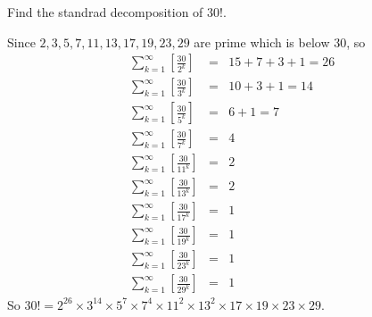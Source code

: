 \documentclass{ctexart}
\begin{document}
\begin{problem}\label{pro:p16.1}
  Find the standrad decomposition of \(30!\).
\end{problem}
\begin{solution}
  Since \(2,3,5,7,11,13,17,19,23,29\) are prime which is below \(30\), so
  \begin{equation}
    \begin{aligned}
      \sum_{k=1}^{\infty}[\frac{30}{2^k}]  & = & 15 + 7 + 3 + 1 =  26  \\
      \sum_{k=1}^{\infty}[\frac{30}{3^k}]  & = & 10 + 3 + 1      =  14 \\
      \sum_{k=1}^{\infty}[\frac{30}{5^k}]  & = & 6 + 1           =  7  \\
      \sum_{k=1}^{\infty}[\frac{30}{7^k}]  & = & 4                     \\
      \sum_{k=1}^{\infty}[\frac{30}{11^k}] & = & 2                     \\
      \sum_{k=1}^{\infty}[\frac{30}{13^k}] & = & 2                     \\
      \sum_{k=1}^{\infty}[\frac{30}{17^k}] & = & 1                     \\
      \sum_{k=1}^{\infty}[\frac{30}{19^k}] & = & 1                     \\
      \sum_{k=1}^{\infty}[\frac{30}{23^k}] & = & 1                     \\
      \sum_{k=1}^{\infty}[\frac{30}{29^k}] & = & 1
    \end{aligned}
  \end{equation}
  So \(30! = 2^{26}\times 3^{14} \times 5^{7} \times 7^{4} \times 11^{2} \times 13^{2} \times 17 \times{19} \times 23 \times 29\).

\end{solution}
\end{document}
